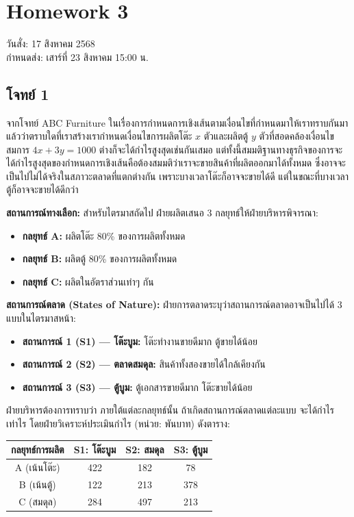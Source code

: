 \newpage
\section*{Homework 3}
วันสั่ง: 17 สิงหาคม 2568\\
กำหนดส่ง: เสาร์ที่ 23 สิงหาคม 15:00 น.
\subsection*{โจทย์ 1}
\noindent จากโจทย์ ABC Furniture ในเรื่องการกำหนดการเชิงเส้นตามเงื่อนไขที่กำหนดมาให้เราทราบกันมาแล้วว่าตราบใดที่เราสร้างเรากำหนดเงื่อนไขการผลิตโต๊ะ $x$ ตัวและผลิตตู้ $y$ ตัวที่สอดคล้องเงื่อนไขสมการ $4x + 3y = 1000$ ต่างก็จะได้กำไรสูงสุดเช่นกันเสมอ แต่ทั้งนี้สมมติฐานทางธุรกิจของการจะได้กำไรสูงสุดของกำหนดการเชิงเส้นคือต้องสมมติว่าเราจะขายสินค้าที่ผลิตออกมาได้ทั้งหมด ซึ่งอาจจะเป็นไปไม่ได้จริงในสภาวะตลาดที่แตกต่างกัน เพราะบางเวลาโต๊ะก็อาจจะขายได้ดี แต่ในขณะที่บางเวลาตู้ก็อาจจะขายได้ดีกว่า

\textbf{สถานการณ์ทางเลือก:} สำหรับไตรมาสถัดไป ฝ่ายผลิตเสนอ 3 กลยุทธ์ให้ฝ่ายบริหารพิจารณา:

\begin{itemize}
    \item \textbf{กลยุทธ์ A:} ผลิตโต๊ะ 80\% ของการผลิตทั้งหมด
    \item \textbf{กลยุทธ์ B:} ผลิตตู้ 80\% ของการผลิตทั้งหมด
    \item \textbf{กลยุทธ์ C:} ผลิตในอัตราส่วนเท่าๆ กัน
\end{itemize}

\noindent
\textbf{สถานการณ์ตลาด (States of Nature):}  
ฝ่ายการตลาดระบุว่าสถานการณ์ตลาดอาจเป็นไปได้ 3 แบบในไตรมาสหน้า:

\begin{itemize}
    \item \textbf{สถานการณ์ 1 (S1) — โต๊ะบูม:} โต๊ะทำงานขายดีมาก ตู้ขายได้น้อย
    \item \textbf{สถานการณ์ 2 (S2) — ตลาดสมดุล:} สินค้าทั้งสองขายได้ใกล้เคียงกัน
    \item \textbf{สถานการณ์ 3 (S3) — ตู้บูม:} ตู้เอกสารขายดีมาก โต๊ะขายได้น้อย
\end{itemize}

ฝ่ายบริหารต้องการทราบว่า ภายใต้แต่ละกลยุทธ์นั้น ถ้าเกิดสถานการณ์ตลาดแต่ละแบบ จะได้กำไรเท่าไร โดยฝ่ายวิเคราะห์ประเมินกำไร (หน่วย: พันบาท) ดังตาราง:

\begin{center}
\begin{tabular}{|c|c|c|c|}
\hline
\textbf{กลยุทธ์การผลิต} & \textbf{S1: โต๊ะบูม} & \textbf{S2: สมดุล} & \textbf{S3: ตู้บูม} \\
\hline
A (เน้นโต๊ะ) & 422 & 182 & 78 \\
B (เน้นตู้) & 122 & 213 & 378 \\
C (สมดุล) & 284 & 497 & 213 \\
\hline
\end{tabular}
\end{center}

